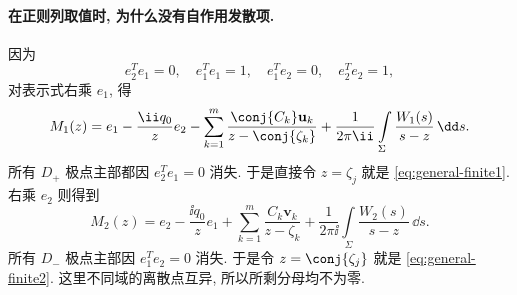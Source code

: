 \paragraph{在正则列取值时, 为什么没有自作用发散项.}
因为
\[
e_2^Te_1=0,\quad e_1^Te_1=1,\quad
e_1^Te_2=0,\quad e_2^Te_2=1,
\]
对表示式右乘 $e_1$, 得
\[
M_1(z)=e_1-\dfrac{\ii q_0}{z}e_2
-\sum\limits_{k=1}^{m}
\dfrac{\conj{C_k}\mathbf u_k}{z-\conj{\zeta_k}}
+\dfrac{1}{2\pi\ii}\int\limits_\Sigma
\dfrac{W_1(s)}{s-z}\,\dd s.
\]
所有 $D_+$ 极点主部都因 $e_2^Te_1=0$ 消失.
于是直接令 $z=\zeta_j$ 就是 \eqref{eq:general-finite1}.
右乘 $e_2$ 则得到
\[
M_2(z)=e_2-\dfrac{\ii q_0}{z}e_1
+\sum\limits_{k=1}^{m}
\dfrac{C_k\mathbf v_k}{z-\zeta_k}
+\dfrac{1}{2\pi\ii}\int\limits_\Sigma
\dfrac{W_2(s)}{s-z}\,\dd s.
\]
所有 $D_-$ 极点主部因 $e_1^Te_2=0$ 消失.
于是令 $z=\conj{\zeta_j}$ 就是 \eqref{eq:general-finite2}.
这里不同域的离散点互异, 所以所剩分母均不为零.

